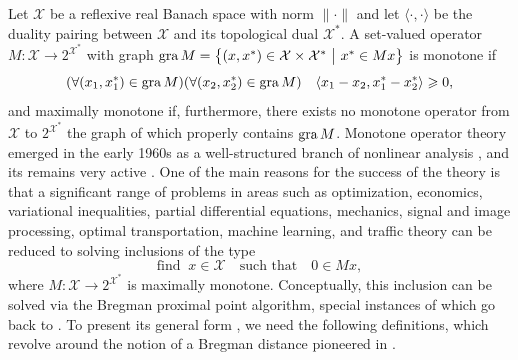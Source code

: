 \documentclass[a4paper,11pt,fleqn]{article}
\renewcommand{\geq}{\ensuremath{\geqslant}}
\newcommand{\pair}[2]{\langle{{#1},{#2}}\rangle}
\newcommand{\menge}[2]{\big\{{#1}~\big |~{#2}\big\}}
\newcommand{\XX}{\ensuremath{{\mathcal X}}}
\newcommand{\gra}{\ensuremath{\text{\rm gra}\,}}
\theoremstyle{plain}{\theorembodyfont{\rmfamily}%
\newtheorem{conjecture}[theorem]{Conjecture}}
\theoremstyle{plain}{\theorembodyfont{\rmfamily}%
\newtheorem{example}[theorem]{Example}}
\theoremstyle{plain}{\theorembodyfont{\rmfamily}%
\newtheorem{remark}[theorem]{Remark}}
\theoremstyle{plain}{\theorembodyfont{\rmfamily}%
\newtheorem{algorithm}[theorem]{Algorithm}}
\theoremstyle{plain}{\theorembodyfont{\rmfamily}%
\newtheorem{condition}[theorem]{Condition}}
\theoremstyle{plain}{\theorembodyfont{\rmfamily}%
\newtheorem{definition}[theorem]{Definition}}
\theoremstyle{plain}{\theorembodyfont{\rmfamily}
\newtheorem{problem}[theorem]{Problem}}
\theoremstyle{plain}{\theorembodyfont{\rmfamily}
\newtheorem{notation}[theorem]{Notation}}
\numberwithin{equation}{section}
\begin{document}
Let $\XX$ be a reflexive real Banach space with norm $\|\cdot\|$
and let $\pair{\cdot}{\cdot}$ be the duality pairing between
$\XX$ and its topological dual $\XX^*$. A set-valued operator 
$M\colon\XX\to 2^{\XX^*}$ with graph
$\gra M=\menge{(x,x^*)\in\XX\times\XX^*}{x^*\in Mx}$ is monotone if 
\begin{equation}
(\forall (x_1,x_1^*)\in\gra M)(\forall (x_2,x_2^*)\in\gra M)\quad
\pair{x_1-x_2}{x_1^*-x_2^*}\geq 0,
\end{equation}
and maximally monotone if, furthermore, there exists no monotone 
operator from $\XX$ to $2^{\XX^*}$ the graph of which properly 
contains $\gra M$. Monotone operator theory emerged in the early 
1960s as a well-structured branch of nonlinear analysis 
\cite{Kach60,Mint61,Mint62,Zara60}, and its remains very active 
\cite{Livre1,Borw10,Simo08,ZeidXX}.
One of the main reasons for the success of the theory is that a
significant range of problems in areas such as optimization, 
economics, variational inequalities, partial differential 
equations, mechanics, signal and image processing, optimal 
transportation, machine learning, and traffic theory can be 
reduced to solving inclusions of the type 
\begin{equation}
\label{e:hanoi-oct2011}
\text{find}\;\;x\in\XX\quad\text{such that}\quad 0\in Mx,
\end{equation}
where $M\colon\XX\to 2^{\XX^*}$ is maximally monotone.
Conceptually, this inclusion can be solved via the Bregman 
proximal point algorithm, special instances of which go back to 
\cite{Ecks93,Kass85,Tebo92}. 
To present its general form \cite{Sico03}, 
we need the following definitions, which revolve around the 
notion of a Bregman distance pioneered in \cite{Breg67}.
\end{document}

